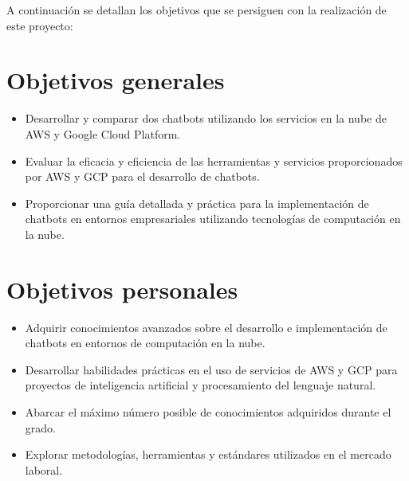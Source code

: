 
A continuación se detallan los objetivos que se persiguen con la realización de este
 proyecto:


\section{Objetivos generales}\label{objetivos_generales}

\begin{itemize}
\tightlist
\item
Desarrollar y comparar dos chatbots utilizando los servicios en la nube de AWS y Google Cloud Platform.
\item
Evaluar la eficacia y eficiencia de las herramientas y servicios proporcionados por AWS y GCP para el desarrollo de chatbots.
\item
Proporcionar una guía detallada y práctica para la implementación de chatbots en entornos empresariales utilizando tecnologías de computación en la nube.


\end{itemize}

\section{Objetivos personales}\label{objetivos-personales}

\begin{itemize}
\tightlist
\item
Adquirir conocimientos avanzados sobre el desarrollo e implementación de chatbots en entornos de computación en la nube.
\item
Desarrollar habilidades prácticas en el uso de servicios de AWS y GCP para proyectos de inteligencia artificial y procesamiento del lenguaje natural.
\item 
Abarcar el máximo número posible de conocimientos adquiridos durante el grado.
\item 
Explorar metodologías, herramientas y estándares utilizados en el
mercado laboral.
\end{itemize}